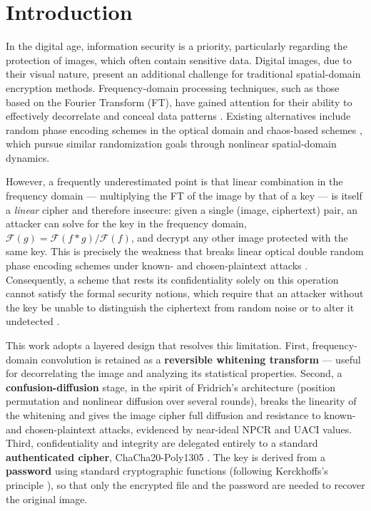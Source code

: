 \documentclass{llncs}
\begin{document}
\section{Introduction}

In the digital age, information security is a priority, particularly
regarding the protection of images, which often contain sensitive data.
Digital images, due to their visual nature, present an additional challenge
for traditional spatial-domain encryption methods. Frequency-domain
processing techniques, such as those based on the Fourier Transform (FT),
have gained attention for their ability to effectively decorrelate and
conceal data patterns \cite{refregier,unnikrishnan}. Existing alternatives
include random phase encoding schemes in the optical domain \cite{javidi}
and chaos-based schemes \cite{chaos1,chaos2}, which pursue similar
randomization goals through nonlinear spatial-domain dynamics.

However, a frequently underestimated point is that linear combination in the
frequency domain --- multiplying the FT of the image by that of a key --- is
itself a \emph{linear} cipher and therefore insecure: given a single
(image, ciphertext) pair, an attacker can solve for the key in the frequency
domain, $\mathcal{F}(g) = \mathcal{F}(f*g)/\mathcal{F}(f)$, and decrypt any
other image protected with the same key. This is precisely the weakness that
breaks linear optical double random phase encoding schemes under known- and
chosen-plaintext attacks \cite{peng,frauel}. Consequently, a scheme that
rests its confidentiality solely on this operation cannot satisfy the formal
security notions, which require that an attacker without the key be unable to
distinguish the ciphertext from random noise or to alter it undetected
\cite{bellare,aead}.

This work adopts a layered design that resolves this limitation. First,
frequency-domain convolution is retained as a \textbf{reversible whitening
transform} --- useful for decorrelating the image and analyzing its
statistical properties. Second, a \textbf{confusion-diffusion} stage, in the
spirit of Fridrich's architecture \cite{fridrich} (position permutation and
nonlinear diffusion over several rounds), breaks the linearity of the
whitening and gives the image cipher full diffusion and resistance to known-
and chosen-plaintext attacks, evidenced by near-ideal NPCR and UACI values.
Third, confidentiality and integrity are delegated entirely to a standard
\textbf{authenticated cipher}, ChaCha20-Poly1305 \cite{rfc8439}. The key is
derived from a \textbf{password} using standard
cryptographic functions (following Kerckhoffs's principle \cite{kerckhoffs}),
so that only the encrypted file and the password are needed to recover the
original image.
\end{document}
